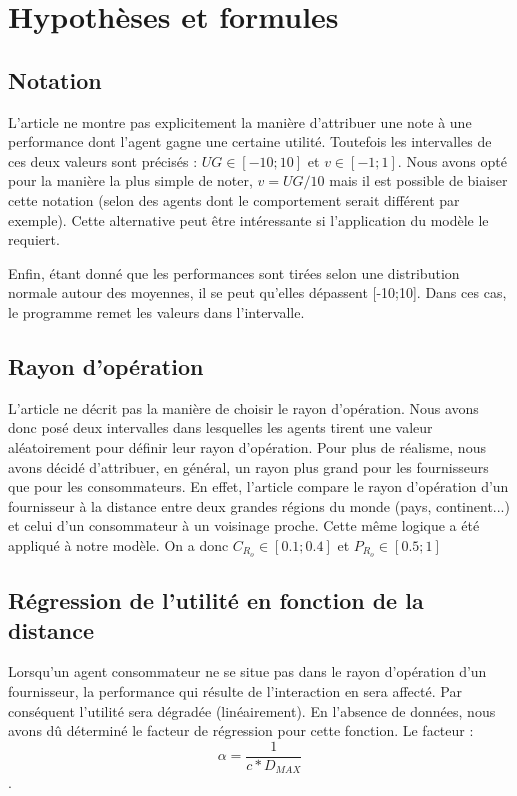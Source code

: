 \section{Hypothèses et formules}
\label{sec:hypotheses}
\subsection{Notation}
L'article ne montre pas explicitement la manière d'attribuer une note à une performance dont l'agent gagne une certaine utilité. Toutefois les intervalles de ces deux valeurs sont précisés : $UG \in [-10;10]$ et $v \in [-1;1]$. Nous avons opté pour la manière la plus simple de noter, $v = UG/10$ mais il est possible de biaiser cette notation (selon des agents dont le comportement serait différent par exemple). Cette alternative peut être intéressante si l'application du modèle le requiert. 

Enfin, étant donné que les performances sont tirées selon une distribution normale autour des moyennes, il se peut qu'elles dépassent [-10;10]. Dans ces cas, le programme remet les valeurs dans l'intervalle.

\subsection{Rayon d'opération}
L'article ne décrit pas la manière de choisir le rayon d'opération. Nous avons donc posé deux intervalles dans lesquelles les agents tirent une valeur aléatoirement pour définir leur rayon d'opération. Pour plus de réalisme, nous avons décidé d'attribuer, en général, un rayon plus grand pour les fournisseurs que pour les consommateurs. En effet, l'article compare le rayon d'opération d'un fournisseur à la distance entre deux grandes régions du monde (pays, continent...) et celui d'un consommateur à un voisinage proche. Cette même logique a été appliqué à notre modèle.
On a donc $C_{R_o} \in [0.1;0.4]$ et $P_{R_o} \in [0.5;1]$


\subsection{Régression de l'utilité en fonction de la distance}
Lorsqu'un agent consommateur ne se situe pas dans le rayon d'opération d'un fournisseur, la performance qui résulte de l'interaction en sera affecté. Par conséquent l'utilité sera dégradée (linéairement). En l'absence de données, nous avons dû déterminé le facteur de régression pour cette fonction. Le facteur :\[ \alpha = \frac{1}{c*D_{MAX}} \]. 

